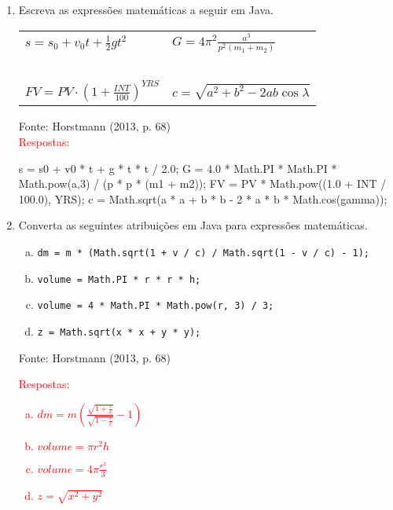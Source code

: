 \documentclass[onecolumn,a4paper,10pt]{report}
\newcommand{\+}{\, + \,}
\newcommand{\<}{\hspace*{-0.4cm}}
\begin{document}
\begin{enumerate}[1.]
\item Escreva as expressões matemáticas a seguir em Java.
\begin{center}
\begin{tabular}{p{5cm}p{5cm}}
$\displaystyle s = s_0 + v_0t+\frac{1}{2}gt^2 $ & $\displaystyle G = 4\pi^2\frac{a^3}{p^2(m_1+m_2)} $ \\
~ & ~\\
$\displaystyle \mathit{FV} = \mathit{PV} \cdot \left( 1 + \frac{\mathit{INT}}{100} \right)^{\mathit{YRS}} $ & $\displaystyle c = \sqrt{a^2+b^2-2ab\cos{\lambda}} $ \\
\end{tabular}
\end{center}
{\tiny Fonte: Horstmann (2013, p. 68)}\\
\textcolor{red}{Respostas:}\\
\begin{javacode}
s = s0 + v0 * t + g * t * t / 2.0;
G = 4.0 * Math.PI * Math.PI * Math.pow(a,3) / (p * p * (m1 + m2));
FV = PV * Math.pow((1.0 + INT / 100.0), YRS);
c = Math.sqrt(a * a + b * b - 2 * a * b * Math.cos(gamma));
\end{javacode}

\item Converta as seguintes atribuições em Java para expressões matemáticas.
\begin{enumerate}[a)]
\item \texttt{dm = m * (Math.sqrt(1 + v / c) / Math.sqrt(1 - v / c) - 1);}
\item \texttt{volume = Math.PI * r * r * h;}
\item \texttt{volume = 4 * Math.PI * Math.pow(r, 3) / 3;}
\item \texttt{z = Math.sqrt(x * x + y * y);}
\end{enumerate}
{\tiny Fonte: Horstmann (2013, p. 68)}\\
\textcolor{red}{Respostas:
\begin{enumerate}[a)]
\item $ dm = m \left( \frac{\sqrt{1+\frac{v}{c}}}{\sqrt{1-\frac{v}{c}}} - 1 \right) $
\item $ volume = \pi r^{2}h $
\item $ volume = 4 \pi \frac{r^3}{3} $
\item $ z = \sqrt{x^2 + y^2} $
\end{enumerate}
}


\end{enumerate}
\end{document}
